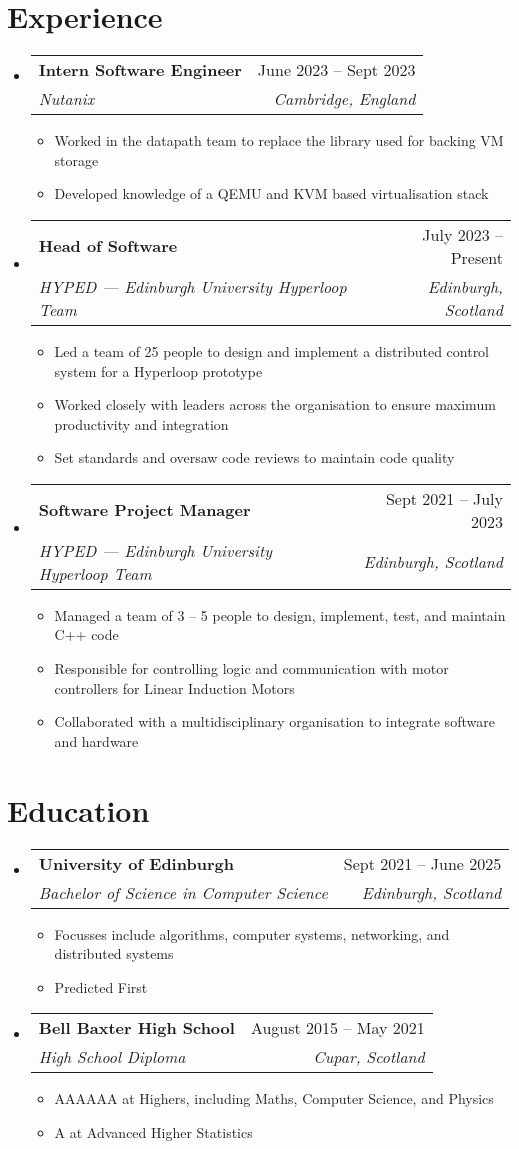 \documentclass[a4paper,11pt]{article}
\makeatletter
\newcommand{\resumeItem}[1]{
  \item\small{#1}
}
\newcommand{\resumeItemListStart}{\begin{itemize}[rightmargin=0.11in]}
\newcommand{\resumeItemListEnd}{\end{itemize}}
\newcommand{\resumeQuadHeading}[4]{
  \item
  \begin{tabular*}{0.96\textwidth}[t]{l@{\extracolsep{\fill}}r}
    \textbf{#1} & #2 \\
    \textit{\small#3} & \textit{\small #4} \\
  \end{tabular*}
}
\newcommand{\resumeHeadingListStart}{
  \begin{itemize}[leftmargin=0.15in, label={}]
}
\newcommand{\resumeHeadingListEnd}{\end{itemize}}
\makeatother
\begin{document}

\section{Experience}
\resumeHeadingListStart{}
  \resumeQuadHeading{Intern Software Engineer}{June 2023 -- Sept 2023}
  {Nutanix}{Cambridge, England}
    \resumeItemListStart{}
      \resumeItem{Worked in the datapath team to replace the library used for backing VM storage}
      \resumeItem{Developed knowledge of a QEMU and KVM based virtualisation stack}
    \resumeItemListEnd{}
  \resumeQuadHeading{Head of Software}{July 2023 -- Present}
  {HYPED --- Edinburgh University Hyperloop Team}{Edinburgh, Scotland}
    \resumeItemListStart{}
      \resumeItem{Led a team of 25 people to design and implement a distributed control system for a Hyperloop prototype}
      \resumeItem{Worked closely with leaders across the organisation to ensure maximum productivity and integration}
      \resumeItem{Set standards and oversaw code reviews to maintain code quality}
    \resumeItemListEnd{}  
  \resumeQuadHeading{Software Project Manager}{Sept 2021 -- July 2023}
  {HYPED --- Edinburgh University Hyperloop Team}{Edinburgh, Scotland}
    \resumeItemListStart{}
      \resumeItem{Managed a team of 3 -- 5 people to design, implement, test, and maintain C++ code}
      \resumeItem{Responsible for controlling logic and communication with motor controllers for Linear Induction Motors}
      \resumeItem{Collaborated with a multidisciplinary organisation to integrate software and hardware}
    \resumeItemListEnd{}
\resumeHeadingListEnd{}



\section{Education}
  \resumeHeadingListStart{}
    \resumeQuadHeading{University of Edinburgh}{Sept 2021 -- June 2025}
    {Bachelor of Science in Computer Science}{Edinburgh, Scotland}
      \resumeItemListStart{}
        \resumeItem{Focusses include algorithms, computer systems, networking, and distributed systems}
        \resumeItem{Predicted First}
      \resumeItemListEnd{}
    \resumeQuadHeading{Bell Baxter High School}{August 2015 -- May 2021}
    {High School Diploma}{Cupar, Scotland}
        \resumeItemListStart{}
            \resumeItem{AAAAAA at Highers, including Maths, Computer Science, and Physics}
            \resumeItem{A at Advanced Higher Statistics}
        \resumeItemListEnd{}
  \resumeHeadingListEnd{}
\end{document}
